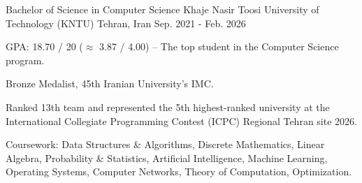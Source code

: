 

\begin{cventries}

  \cventry
    {Bachelor of Science in Computer Science} %
    {Khaje Nasir Toosi University of Technology (KNTU)} %
    {Tehran, Iran} %
    {Sep. 2021 - Feb. 2026} %
    {
      \begin{cvitems} %
        \item {GPA: 18.70 / 20 ($\approx$ 3.87 / 4.00) -- The top student in the Computer Science program.}
        \item {Bronze Medalist, 45th Iranian University's IMC.}
        \item {Ranked 13th team and represented the 5th highest-ranked university at the International Collegiate Programming Contest (ICPC) Regional Tehran site 2026.}
        \item {Coursework: Data Structures \& Algorithms, Discrete Mathematics, Linear Algebra, Probability \& Statistics, Artificial Intelligence, Machine Learning, Operating Systems, Computer Networks, Theory of Computation, Optimization.}
      \end{cvitems}
    }

\end{cventries}
